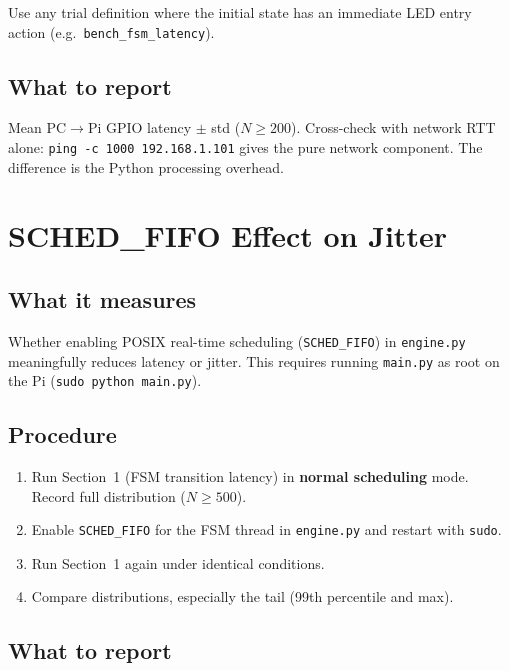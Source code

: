 \documentclass[11pt, a4paper]{article}
\begin{document}
Use any trial definition where the initial state has an immediate LED entry
action (e.g.\ \texttt{bench\_fsm\_latency}).

\subsection*{What to report}

Mean PC$\rightarrow$Pi GPIO latency $\pm$ std ($N \geq 200$). Cross-check with
network RTT alone: \texttt{ping -c 1000 192.168.1.101} gives the pure network
component. The difference is the Python processing overhead.

\newpage

\section{SCHED\_FIFO Effect on Jitter}

\subsection*{What it measures}

Whether enabling POSIX real-time scheduling (\texttt{SCHED\_FIFO}) in
\texttt{engine.py} meaningfully reduces latency or jitter. This requires
running \texttt{main.py} as root on the Pi (\texttt{sudo python main.py}).

\subsection*{Procedure}

\begin{enumerate}[noitemsep]
    \item Run Section~1 (FSM transition latency) in \textbf{normal scheduling}
          mode. Record full distribution ($N \geq 500$).
    \item Enable \texttt{SCHED\_FIFO} for the FSM thread in \texttt{engine.py}
          and restart with \texttt{sudo}.
    \item Run Section~1 again under identical conditions.
    \item Compare distributions, especially the tail (99th percentile and max).
\end{enumerate}

\subsection*{What to report}
\end{document}
